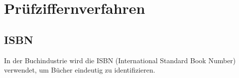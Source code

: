 
\chapter{Prüfziffernverfahren}


\section{ISBN}

In der Buchindustrie wird die ISBN (International Standard Book Number) verwendet, um Bücher eindeutig zu identifizieren.
